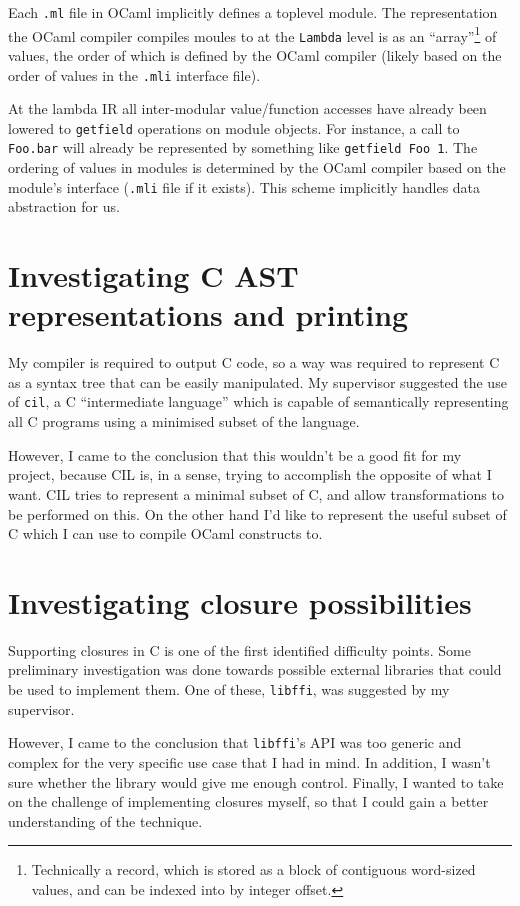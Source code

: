 \documentclass[12pt,a4paper,twoside,openright]{report}
\begin{document}
Each \lstinline!.ml! file in OCaml implicitly defines a toplevel module. The
representation the OCaml compiler compiles moules to at the \lstinline!Lambda!
level is as an ``array''\footnote{Technically a record, which is stored as a
block of contiguous word-sized values, and can be indexed into by integer
offset.} of values, the order of which is defined by the OCaml compiler (likely
based on the order of values in the \texttt{.mli} interface file).

At the lambda IR all inter-modular value/function accesses have already been
lowered to \lstinline!getfield! operations on module objects. For instance, a
call to \lstinline!Foo.bar! will already be represented by something like
\lstinline!getfield Foo 1!. The ordering of values in modules is determined by
the OCaml compiler based on the module's interface (\lstinline!.mli! file if it
exists). This scheme implicitly handles data abstraction for us.

\section{Investigating C AST representations and printing}

My compiler is required to output C code, so a way was required to represent C
as a syntax tree that can be easily manipulated. My supervisor suggested the
use of \lstinline!cil!, a C ``intermediate language'' which is capable of
semantically representing all C programs using a minimised subset of the language.

However, I came to the conclusion that this wouldn't be a good fit for my project, because
 CIL is, in a sense, trying to accomplish the opposite of what I want. CIL
 tries to represent a minimal subset of C, and allow transformations to be
 performed on this. On the other hand I'd like to represent the useful subset
 of C which I can use to compile OCaml constructs to.


\section{Investigating closure possibilities}

Supporting closures in C is one of the first identified difficulty points.
Some preliminary investigation was done towards possible external libraries
that could be used to implement them. One of these, \lstinline!libffi!,
was suggested by my supervisor.

However, I came to the conclusion that \lstinline!libffi!'s API was too generic
and complex for the very specific use case that I had in mind. In addition, I
wasn't sure whether the library would give me enough control. Finally, I wanted
to take on the challenge of implementing closures myself, so that I could gain
a better understanding of the technique.
\end{document}
